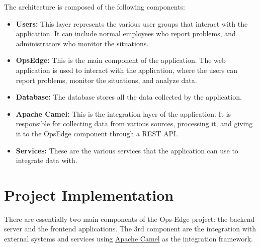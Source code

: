 The architecture is composed of the following components:

\begin{itemize}
    \item \textbf{Users:} This layer represents the various user groups that interact with the application. It can include normal employees who report problems, and administrators who monitor the situations.
    \item \textbf{OpsEdge:} This is the main component of the application. The web application is used to interact with the application, where the users can report problems, monitor the situations, and analyze data.
    \item \textbf{Database:} The database stores all the data collected by the application.
    \item \textbf{Apache Camel:} This is the integration layer of the application. It is responsible for collecting data from various sources, processing it, and giving it to the OpsEdge component through a REST API\@.
    \item \textbf{Services:} These are the various services that the application can use to integrate data with.
\end{itemize}

%
%
\section{Project Implementation}
\label{sec:project_description:project_implementation}
There are essentially two main components of the Ops-Edge project: the backend server and the frontend applications. The 3rd component are the integration with external systems and services using \href{https://camel.apache.org/}{Apache Camel} as the integration framework.

